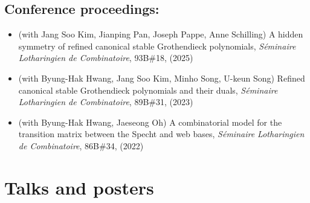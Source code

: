 \documentclass[letterpaper]{article}
\begin{document}
\subsection*{Conference proceedings:}
\begin{itemize}
\item (with Jang Soo Kim, Jianping Pan, Joseph Pappe, Anne Schilling) A hidden symmetry of refined canonical stable Grothendieck polynomials, {\it S\'eminaire Lotharingien de Combinatoire}, 93B\#18, (2025)
\item (with Byung-Hak Hwang, Jang Soo Kim, Minho Song, U-keun Song) Refined canonical stable Grothendieck polynomials and their duals,
  {\it S\'eminaire Lotharingien de Combinatoire}, 89B\#31, (2023)
\item (with Byung-Hak Hwang, Jaeseong Oh) A combinatorial model for the transition matrix between the Specht and web bases,
  {\it S\'eminaire Lotharingien de Combinatoire}, 86B\#34, (2022)
\end{itemize}


\section*{Talks and posters}
\end{document}
